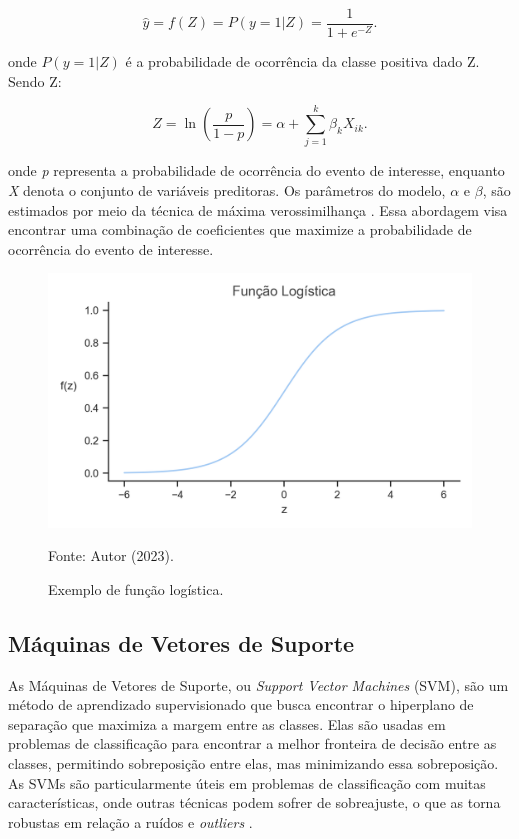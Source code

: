 \begin{equation}
    \hat{y} = f(Z) = P(y = 1 | Z) = \frac{1}{1 + e^{-Z}}.
\end{equation}

onde $P(y = 1 | Z)$ é a probabilidade de ocorrência da classe positiva dado Z. Sendo Z:

\begin{equation}
    Z = \ln(\frac{p}{1 - p}) = \alpha + \sum_{j=1}^{k} \beta_k X_{ik}.
\end{equation}

onde \textit{p} representa a probabilidade de ocorrência do evento de interesse, enquanto \textit{X} denota o conjunto de variáveis preditoras. Os parâmetros do modelo, $\alpha$ e $\beta$, são estimados por meio da técnica de máxima verossimilhança \cite{favero}. Essa abordagem visa encontrar uma combinação de coeficientes que maximize a probabilidade de ocorrência do evento de interesse.

\begin{figure}
    \centering
    \caption{\label{img:logreg}Exemplo de função logística.}
    \includegraphics[scale=0.7]{USPSC-img/funcao-logistica.png}
    \begin{center}
        Fonte: Autor (2023).
    \end{center}
\end{figure}

\subsection{Máquinas de Vetores de Suporte}

As Máquinas de Vetores de Suporte, ou \textit{Support Vector Machines} (SVM), são um método de aprendizado supervisionado que busca encontrar o hiperplano de separação que maximiza a margem entre as classes. Elas são usadas em problemas de classificação para encontrar a melhor fronteira de decisão entre as classes, permitindo sobreposição entre elas, mas minimizando essa sobreposição. As SVMs são particularmente úteis em problemas de classificação com muitas características, onde outras técnicas podem sofrer de sobreajuste, o que as torna robustas em relação a ruídos e \textit{outliers} \cite{trevorHastie}.

